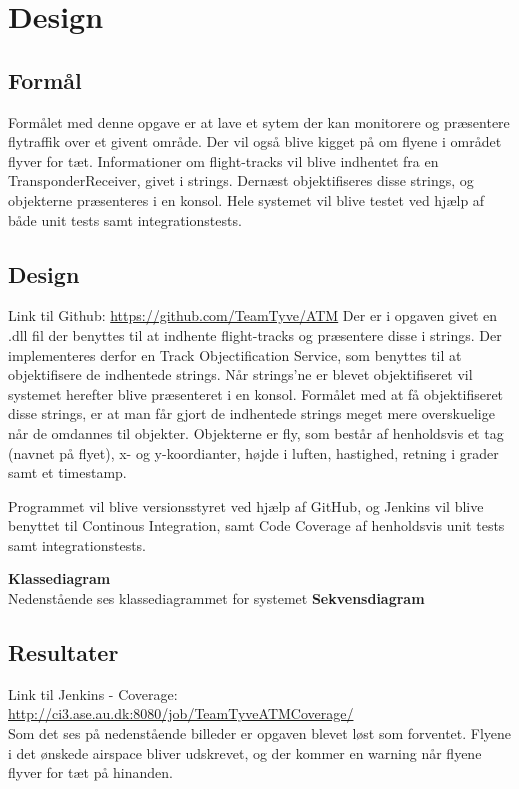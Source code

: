 \chapter{Design}
\section{Formål}
Formålet med denne opgave er at lave et sytem der kan monitorere og præsentere flytraffik over et givent område. Der vil også blive kigget på om flyene i området flyver for tæt. Informationer om flight-tracks vil blive indhentet fra en TransponderReceiver, givet i strings. Dernæst objektifiseres disse strings, og objekterne præsenteres i en konsol. 
Hele systemet vil blive testet ved hjælp af både unit tests samt integrationstests.


\section{Design}
Link til Github: \url{https://github.com/TeamTyve/ATM} \newline \newline 
Der er i opgaven givet en .dll fil der benyttes til at indhente flight-tracks og præsentere disse i strings. Der implementeres derfor en Track Objectification Service, som benyttes til at objektifisere de indhentede strings. \tabularnewline
Når strings'ne er blevet objektifiseret vil systemet herefter blive præsenteret i en konsol. \newline
Formålet med at få objektifiseret disse strings, er at man får gjort de indhentede strings meget mere overskuelige når de omdannes til objekter. \newline
Objekterne er fly, som består af henholdsvis et tag (navnet på flyet), x- og y-koordianter, højde i luften, hastighed, retning i grader samt et timestamp.


Programmet vil blive versionsstyret ved hjælp af GitHub, og Jenkins vil blive benyttet til Continous Integration, samt Code Coverage af henholdsvis unit tests samt integrationstests. \newline

\textbf{Klassediagram} \\
Nedenstående ses klassediagrammet for systemet \newline
\textbf{Sekvensdiagram} \\


\section{Resultater}
Link til Jenkins - Coverage: \url{http://ci3.ase.au.dk:8080/job/TeamTyveATMCoverage/} \\
Som det ses på nedenstående billeder er opgaven blevet løst som forventet. Flyene i det ønskede airspace bliver udskrevet, og der kommer en warning når flyene flyver for tæt på hinanden.




